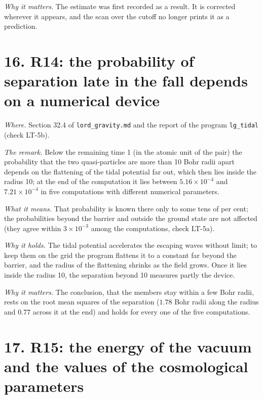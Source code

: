 \documentclass[
  10pt,
]{article}
\begin{document}
\emph{Why it matters.} The estimate was first recorded as a result. It
is corrected wherever it appears, and the scan over the cutoff no longer
prints it as a prediction.

\hypertarget{r14-the-probability-of-separation-late-in-the-fall-depends-on-a-numerical-device}{%
\section{16. R14: the probability of separation late in the fall depends
on a numerical
device}\label{r14-the-probability-of-separation-late-in-the-fall-depends-on-a-numerical-device}}

\emph{Where.} Section 32.4 of \texttt{lord\_gravity.md} and the report
of the program \texttt{lg\_tidal} (check LT-5b).

\emph{The remark.} Below the remaining time 1 (in the atomic unit of the
pair) the probability that the two quasi-particles are more than 10 Bohr
radii apart depends on the flattening of the tidal potential far out,
which then lies inside the radius 10; at the end of the computation it
lies between \(5.16\times10^{-4}\) and \(7.21\times10^{-4}\) in five
computations with different numerical parameters.

\emph{What it means.} That probability is known there only to some tens
of per cent; the probabilities beyond the barrier and outside the ground
state are not affected (they agree within \(3\times10^{-3}\) among the
computations, check LT-5a).

\emph{Why it holds.} The tidal potential accelerates the escaping waves
without limit; to keep them on the grid the program flattens it to a
constant far beyond the barrier, and the radius of the flattening
shrinks as the field grows. Once it lies inside the radius 10, the
separation beyond 10 measures partly the device.

\emph{Why it matters.} The conclusion, that the members stay within a
few Bohr radii, rests on the root mean squares of the separation
(\(1.78\) Bohr radii along the radius and \(0.77\) across it at the end)
and holds for every one of the five computations.

\hypertarget{r15-the-energy-of-the-vacuum-and-the-values-of-the-cosmological-parameters}{%
\section{17. R15: the energy of the vacuum and the values of the
cosmological
parameters}\label{r15-the-energy-of-the-vacuum-and-the-values-of-the-cosmological-parameters}}
\end{document}

